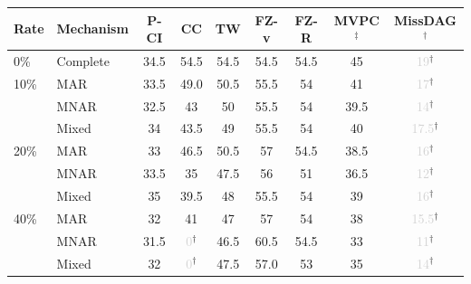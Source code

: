 \begin{tabular}{llccccccc}
    \toprule
    Rate & Mechanism & P-CI & CC & TW & FZ-v & FZ-R & MVPC$^\ddagger$ & MissDAG$^\dagger$ \\
    \midrule
    0\% & Complete & 34.5 & 54.5 & 54.5 & 54.5 & 54.5 & 45 & \textcolor{lightgray}{19}$^\dagger$ \\
    \midrule
    10\% & MAR   & 33.5 & 49.0 & 50.5 & 55.5 & 54 & 41 & \textcolor{lightgray}{17}$^\dagger$ \\
         & MNAR  & 32.5 & 43 & 50 & 55.5 & 54 & 39.5 & \textcolor{lightgray}{14}$^\dagger$ \\
         & Mixed & 34 & 43.5 & 49 & 55.5 & 54 & 40 & \textcolor{lightgray}{17.5}$^\dagger$ \\
    \midrule
    20\% & MAR   & 33 & 46.5 & 50.5 & 57 & 54.5 & 38.5 & \textcolor{lightgray}{16}$^\dagger$ \\
         & MNAR  & 33.5 & 35 & 47.5 & 56 & 51 & 36.5 & \textcolor{lightgray}{12}$^\dagger$ \\
         & Mixed & 35 & 39.5 & 48 & 55.5 & 54 & 39 & \textcolor{lightgray}{16}$^\dagger$ \\
    \midrule
    40\% & MAR   & 32 & 41 & 47 & 57 & 54 & 38 & \textcolor{lightgray}{15.5}$^\dagger$ \\
         & MNAR  & 31.5 & \textcolor{lightgray}{0}$^\dagger$ & 46.5 & 60.5 & 54.5 & 33 & \textcolor{lightgray}{11}$^\dagger$ \\
         & Mixed & 32 & \textcolor{lightgray}{0}$^\dagger$ & 47.5 & 57.0 & 53 & 35 & \textcolor{lightgray}{14}$^\dagger$ \\
    \bottomrule
\end{tabular}
